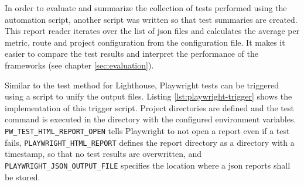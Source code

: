 \documentclass[a4paper, 12pt]{article}
\begin{document}
In order to evaluate and summarize the collection of tests performed using the automation script, another script was written so that test summaries are created.
This report reader iterates over the list of \acrshort{json} files and calculates the average per metric, route and project configuration from the configuration file.
It makes it easier to compare the test results and interpret the performance of the frameworks (see chapter \ref{sec:evaluation}).

Similar to the test method for Lighthouse, Playwright tests can be triggered using a script to unify the output files.
Listing \ref{lst:playwright-trigger} shows the implementation of this trigger script.
Project directories are defined and the test command is executed in the directory with the configured environment variables.
\verb|PW_TEST_HTML_REPORT_OPEN| tells Playwright to not open a report even if a test fails, \verb|PLAYWRIGHT_HTML_REPORT| defines the report directory as a directory with a timestamp, so that no test results are overwritten, and \verb|PLAYWRIGHT_JSON_OUTPUT_FILE| specifies the location where a \acrshort{json} reports shall be stored.
\end{document}
